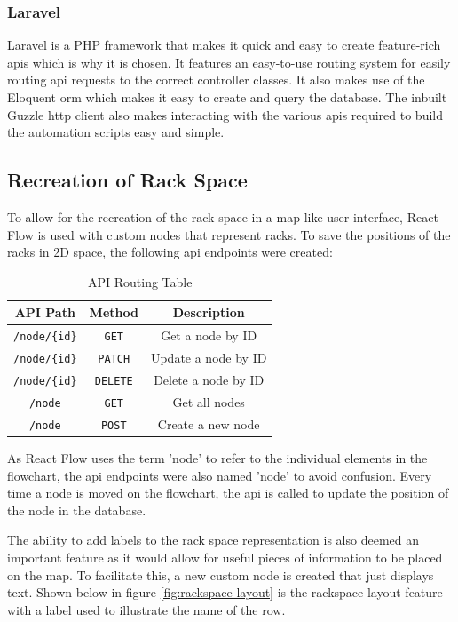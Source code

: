 \subsubsection{Laravel}
Laravel is a PHP framework that makes it quick and easy to create feature-rich \gls{api}s which is why it is chosen. It features an easy-to-use routing system for easily routing \gls{api} requests to the correct controller classes. It also makes use of the Eloquent \gls{orm} which makes it easy to create and query the database. The inbuilt Guzzle \gls{http} client also makes interacting with the various \gls{api}s required to build the automation scripts easy and simple.

\subsection{Recreation of Rack Space}
To allow for the recreation of the rack space in a map-like user interface, React Flow is used with custom nodes that represent racks. To save the positions of the racks in 2D space, the following \gls{api} endpoints were created:
\begin{table}[H]
    \centering
    \begin{tabular}{@{} c c c @{}}
        \toprule
        \textbf{API Path}     & \textbf{Method} & \textbf{Description} \\
        \midrule
        \texttt{/node/\{id\}} & \texttt{GET}    & Get a node by ID     \\
        \texttt{/node/\{id\}} & \texttt{PATCH}  & Update a node by ID  \\
        \texttt{/node/\{id\}} & \texttt{DELETE} & Delete a node by ID  \\
        \texttt{/node}        & \texttt{GET}    & Get all nodes        \\
        \texttt{/node}        & \texttt{POST}   & Create a new node    \\
        \bottomrule
    \end{tabular}
    \caption{API Routing Table}
\end{table}

As React Flow uses the term 'node' to refer to the individual elements in the flowchart, the \gls{api} endpoints were also named 'node' to avoid confusion. Every time a node is moved on the flowchart, the \gls{api} is called to update the position of the node in the database. 

The ability to add labels to the rack space representation is also deemed an important feature as it would allow for useful pieces of information to be placed on the map. To facilitate this, a new custom node is created that just displays text. Shown below in figure \ref{fig:rackspace-layout} is the rackspace layout feature with a label used to illustrate the name of the row.

